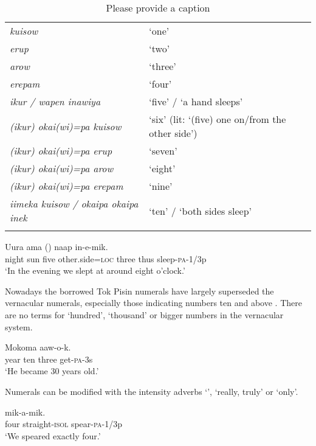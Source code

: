 \begin{table}
\caption{Please provide a caption}
 
\begin{tabular}{>{\itshape}ll}
\mytoprule
kuisow &`one'\\
erup &`two'\\
arow &`three'\\
erepam &`four'\\
ikur / wapen inawiya &`five' / `a hand sleeps'\\
(ikur) okai(wi)=pa kuisow &`six' (lit: `(five) one on/from the other side')\\
(ikur) okai(wi)=pa erup &`seven'\\
(ikur) okai(wi)=pa arow &`eight'\\
(ikur) okai(wi)=pa erepam &`nine'\\
iimeka kuisow / okaipa okaipa inek &`ten' / `both sides sleep'\\
\mybottomrule
\end{tabular}
\end{table}


\ea%
\label{ex:3:x90}
\gll Uura ama  ()  naap in-e-mik. \\
night sun five other.side=\textsc{loc} three thus sleep-\textsc{pa}-1/3p\\
\glt`In the evening we slept at around eight o'clock.'
\z

Nowadays the borrowed Tok Pisin numerals have largely superseded the vernacular numerals, especially those indicating numbers ten and above . There are no terms for `hundred', `thousand' or bigger numbers in the vernacular system.

\ea%
\label{ex:3:x91}
\gll Mokoma   aaw-o-k. \\
year ten three get-\textsc{pa}-3s\\
\glt`He became 30 years old.'
\z

Numerals can be modified with the intensity adverbs  `',  `really, truly' or  `only'.

\ea%
\label{ex:3:x443}
\gll {}  mik-a-mik. \\
four straight-\textsc{isol} spear-\textsc{pa}-1/3p\\
\glt`We speared exactly four.'
\z

